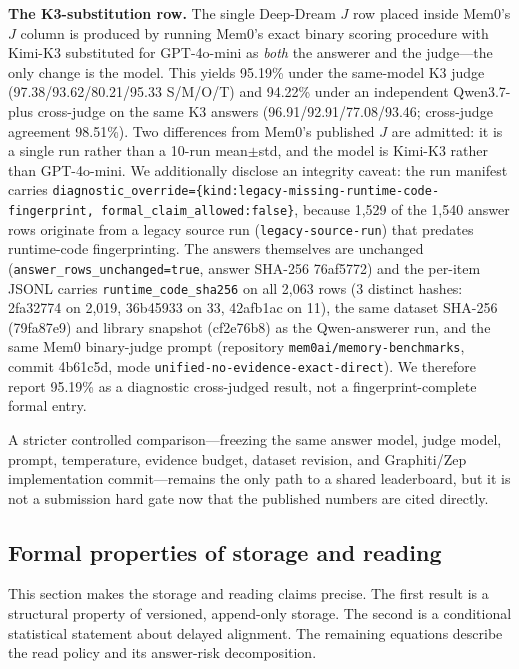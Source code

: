 \textbf{The K3-substitution row.}
\label{app:k3-substitution}
The single Deep-Dream $J$ row placed inside Mem0's $J$ column is produced by running Mem0's exact binary scoring procedure with Kimi-K3 substituted for GPT-4o-mini as \emph{both} the answerer and the judge---the only change is the model. This yields 95.19\% under the same-model K3 judge (97.38/93.62/80.21/95.33 S/M/O/T) and 94.22\% under an independent Qwen3.7-plus cross-judge on the same K3 answers (96.91/92.91/77.08/93.46; cross-judge agreement 98.51\%). Two differences from Mem0's published $J$ are admitted: it is a single run rather than a 10-run mean$\pm$std, and the model is Kimi-K3 rather than GPT-4o-mini. We additionally disclose an integrity caveat: the run manifest carries \texttt{diagnostic\_override=\{kind:legacy-missing-runtime-code-fingerprint, formal\_claim\_allowed:false\}}, because 1{,}529 of the 1{,}540 answer rows originate from a legacy source run (\texttt{legacy-source-run}) that predates runtime-code fingerprinting. The answers themselves are unchanged (\texttt{answer\_rows\_unchanged=true}, answer SHA-256 76af5772) and the per-item JSONL carries \texttt{runtime\_code\_sha256} on all 2{,}063 rows (3 distinct hashes: 2fa32774 on 2{,}019, 36b45933 on 33, 42afb1ac on 11), the same dataset SHA-256 (79fa87e9) and library snapshot (cf2e76b8) as the Qwen-answerer run, and the same Mem0 binary-judge prompt (repository \texttt{mem0ai/memory-benchmarks}, commit 4b61c5d, mode \texttt{unified-no-evidence-exact-direct}). We therefore report 95.19\% as a diagnostic cross-judged result, not a fingerprint-complete formal entry.

A stricter controlled comparison---freezing the same answer model, judge model, prompt, temperature, evidence budget, dataset revision, and Graphiti/Zep implementation commit---remains the only path to a shared leaderboard, but it is not a submission hard gate now that the published numbers are cited directly.

\subsection{Formal properties of storage and reading}
\label{app:info-theory}

This section makes the storage and reading claims precise. The first result is a structural property of versioned, append-only storage. The second is a conditional statistical statement about delayed alignment. The remaining equations describe the read policy and its answer-risk decomposition.

